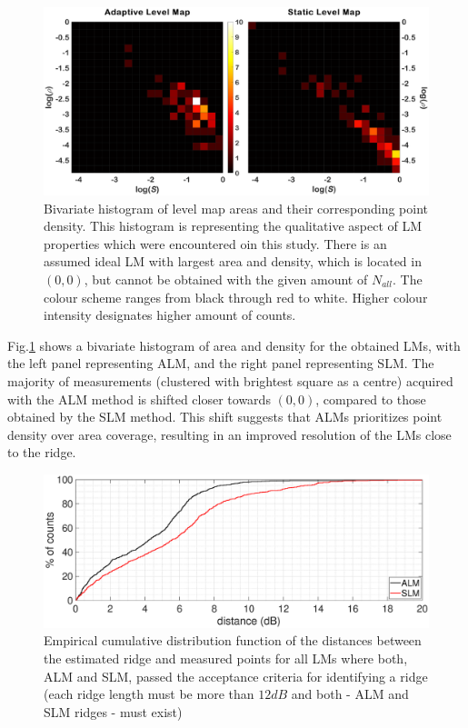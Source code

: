 \documentclass[journal,twoside,web]{ieeecolor2}
\begin{document}
\begin{figure}
\centering
\includegraphics[width=.8\textwidth]{Fig_8_Coverage_sameClim.eps} %
\caption{Bivariate histogram of level map areas and their corresponding point density.
This histogram is representing the qualitative aspect of LM properties which were encountered oin this study.
There is an assumed ideal LM with largest area and density, which is located in $(0, 0)$, but cannot be obtained with the given amount of $N_{all}$.
The colour scheme ranges from black through red to white.
Higher colour intensity designates higher amount of counts.}
\label{fig_TGT}
\end{figure}

Fig.\ref{fig_TGT} shows a bivariate histogram of area and density for the obtained LMs, with the left panel representing ALM, and the right panel representing SLM.
The majority of measurements (clustered with brightest square as a centre) acquired with the ALM method is shifted closer towards $(0, 0)$, compared to those obtained by the SLM method.
This shift suggests that ALMs prioritizes point density over area coverage, resulting in an improved resolution of the LMs close to the ridge.


\begin{figure}[ht]
\centerline{\includegraphics[width=\columnwidth]{Fig_9_Cumula.eps}}
\caption{Empirical cumulative distribution function of the distances between the estimated ridge and measured points for all LMs where both, ALM and SLM, passed the acceptance criteria for identifying a ridge (each ridge length must be more than $12dB$ and both - ALM and SLM ridges - must exist)}
\label{fig_CDF}
\end{figure}
\end{document}
